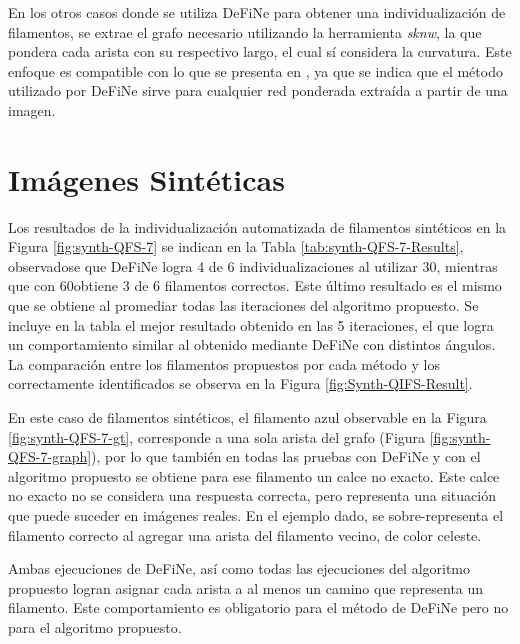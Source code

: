 En los otros casos donde se utiliza DeFiNe para obtener una individualizaci\'on de filamentos, se extrae el grafo necesario utilizando la herramienta {\it sknw}, la que pondera cada arista con su respectivo largo, el cual s\'i considera la curvatura. Este enfoque es compatible con lo que se presenta en \cite{breuer2015define}, ya que se indica que el m\'etodo utilizado por DeFiNe sirve para cualquier red ponderada extra\'ida a partir de una imagen.


\section{Im\'agenes Sint\'eticas}

Los resultados de la individualizaci\'on automatizada de filamentos sint\'eticos en la Figura \ref{fig:synth-QFS-7} se indican en la Tabla \ref{tab:synth-QFS-7-Results}, observadose que DeFiNe logra 4 de 6 individualizaciones al utilizar 30\textdegree, mientras que con 60\textdegree obtiene 3 de 6 filamentos correctos. Este \'ultimo resultado es el mismo que se obtiene al promediar todas las iteraciones del algoritmo propuesto. Se incluye en la tabla el mejor resultado obtenido en las 5 iteraciones, el que logra un comportamiento similar al obtenido mediante DeFiNe con distintos \'angulos. La comparaci\'on entre los filamentos propuestos por cada m\'etodo y los correctamente identificados se observa en la Figura \ref{fig:Synth-QIFS-Result}.


En este caso de filamentos sint\'eticos, el filamento azul observable en la Figura \ref{fig:synth-QFS-7-gt}, corresponde a una sola arista del grafo (Figura \ref{fig:synth-QFS-7-graph}), por lo que tambi\'en en todas las pruebas con DeFiNe y con el algoritmo propuesto se obtiene para ese filamento un calce no exacto. Este calce no exacto no se considera una respuesta correcta, pero representa una situaci\'on que puede suceder en im\'agenes reales. En el ejemplo dado, se sobre-representa el filamento correcto al agregar una arista del filamento vecino, de color celeste.


Ambas ejecuciones de DeFiNe, as\'i como todas las ejecuciones del algoritmo propuesto logran asignar cada arista a al menos un camino que representa un filamento. Este comportamiento es obligatorio para el m\'etodo de DeFiNe pero no para el algoritmo propuesto.



